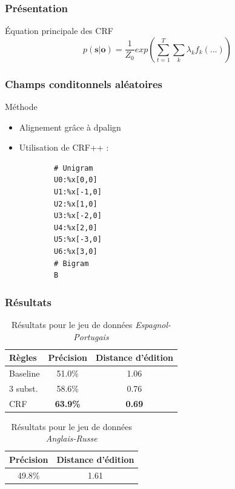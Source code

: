 \documentclass{beamer}
\begin{document}
\begin{frame}
\frametitle{Présentation}
\begin{block}{Équation principale des CRF}
\begin{equation}
p(\textbf{s}|\textbf{o}) = \frac{1}{Z_0}exp(\sum_{t=1}^T\sum_k \lambda_k f_k(...))
\label{eqcrf}
\end{equation}
\end{block}
\end{frame}

\begin{frame}[fragile]
\frametitle{Champs conditonnels aléatoires}
	\begin{block}{Méthode}
		\begin{itemize}
		\item Alignement grâce à dpalign
		\item Utilisation de CRF++ :
		{\scriptsize \begin{verbatim}
		# Unigram
		U0:%x[0,0]
		U1:%x[-1,0]
		U2:%x[1,0]
		U3:%x[-2,0]
		U4:%x[2,0]
		U5:%x[-3,0]
		U6:%x[3,0]
		# Bigram
		B
		\end{verbatim}}
		\end{itemize}
	\end{block}
\end{frame}

\begin{frame}
\frametitle{Résultats}
\begin{table}[H]
\caption{Résultats pour le jeu de données \emph{Espagnol-Portugais} }
\begin{tabular}{|l|c|c|}
\hline
Règles&Précision&Distance d'édition\\
\hline
Baseline&51.0\%&1.06\\
\hline
3 subst.&58.6\%&0.76\\
\hline
CRF&\textbf{63.9\%}&\textbf{0.69}\\
\hline
\end{tabular}
\end{table}

\begin{table}[H]
\caption{Résultats pour le jeu de données \emph{Anglais-Russe} }
\begin{center}
\begin{tabular}{|c|c|}
\hline
Précision&Distance d'édition\\
\hline
49.8\%&1.61\\
\hline
\end{tabular}
\end{center}
\end{table}

\end{frame}
\end{document}
